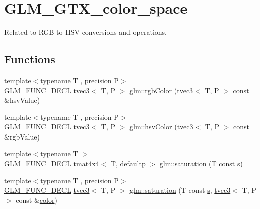 \hypertarget{group__gtx__color__space}{}\section{G\+L\+M\+\_\+\+G\+T\+X\+\_\+color\+\_\+space}
\label{group__gtx__color__space}


Related to R\+GB to H\+SV conversions and operations.  


\subsection*{Functions}
\begin{DoxyCompactItemize}
\item 
{\footnotesize template$<$typename T , precision P$>$ }\\\mbox{\hyperlink{setup_8hpp_ab2d052de21a70539923e9bcbf6e83a51}{G\+L\+M\+\_\+\+F\+U\+N\+C\+\_\+\+D\+E\+CL}} \mbox{\hyperlink{structglm_1_1tvec3}{tvec3}}$<$ T, P $>$ \mbox{\hyperlink{group__gtx__color__space_ga36b0619e31daf57bc4a54dac2dcf34b7}{glm\+::rgb\+Color}} (\mbox{\hyperlink{structglm_1_1tvec3}{tvec3}}$<$ T, P $>$ const \&hsv\+Value)
\item 
{\footnotesize template$<$typename T , precision P$>$ }\\\mbox{\hyperlink{setup_8hpp_ab2d052de21a70539923e9bcbf6e83a51}{G\+L\+M\+\_\+\+F\+U\+N\+C\+\_\+\+D\+E\+CL}} \mbox{\hyperlink{structglm_1_1tvec3}{tvec3}}$<$ T, P $>$ \mbox{\hyperlink{group__gtx__color__space_gae72039c00a7be2f03a3b94b37a54349a}{glm\+::hsv\+Color}} (\mbox{\hyperlink{structglm_1_1tvec3}{tvec3}}$<$ T, P $>$ const \&rgb\+Value)
\item 
{\footnotesize template$<$typename T $>$ }\\\mbox{\hyperlink{setup_8hpp_ab2d052de21a70539923e9bcbf6e83a51}{G\+L\+M\+\_\+\+F\+U\+N\+C\+\_\+\+D\+E\+CL}} \mbox{\hyperlink{structglm_1_1tmat4x4}{tmat4x4}}$<$ T, \mbox{\hyperlink{namespaceglm_a0f04f086094c747d227af4425893f545a9d21ccd8b5a009ec7eb7677befc3bf51}{defaultp}} $>$ \mbox{\hyperlink{group__gtx__color__space_gafecfb15d58da8445103745af3348e516}{glm\+::saturation}} (T const \mbox{\hyperlink{glad_8h_af1b1d5edfea6a34daee7389b1b5810ad}{s}})
\item 
{\footnotesize template$<$typename T , precision P$>$ }\\\mbox{\hyperlink{setup_8hpp_ab2d052de21a70539923e9bcbf6e83a51}{G\+L\+M\+\_\+\+F\+U\+N\+C\+\_\+\+D\+E\+CL}} \mbox{\hyperlink{structglm_1_1tvec3}{tvec3}}$<$ T, P $>$ \mbox{\hyperlink{group__gtx__color__space_ga632ee8dadb44e90a05885f6f8c07d46c}{glm\+::saturation}} (T const \mbox{\hyperlink{glad_8h_af1b1d5edfea6a34daee7389b1b5810ad}{s}}, \mbox{\hyperlink{structglm_1_1tvec3}{tvec3}}$<$ T, P $>$ const \&\mbox{\hyperlink{glad_8h_a69995a929d818b8b467d4593c24d98bc}{color}})

\end{DoxyCompactItemize}
